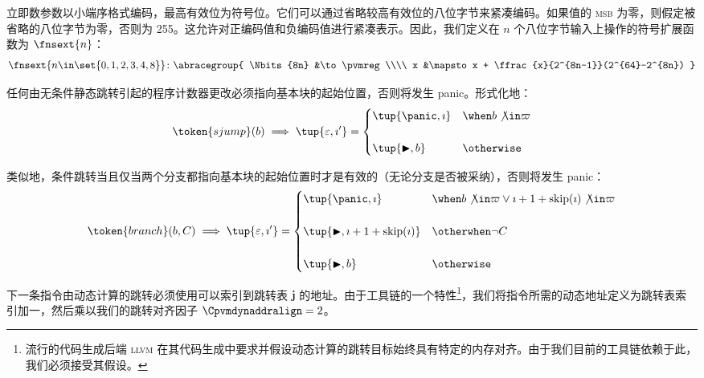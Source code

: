 立即数参数以小端序格式编码，最高有效位为符号位。它们可以通过省略较高有效位的八位字节来紧凑编码。如果值的 \textsc{msb} 为零，则假定被省略的八位字节为零，否则为 255。这允许对正编码值和负编码值进行紧凑表示。因此，我们定义在 $n$ 个八位字节输入上操作的符号扩展函数为 $\fnsext{n}$：
\begin{align}\label{eq:signedextension}
  \fnsext{n \in \set{0, 1, 2, 3, 4, 8}}\colon\abracegroup{
    \Nbits{8n} &\to \pvmreg\\\\
    x &\mapsto x + \ffrac{x}{2^{8n-1}}(2^{64}-2^{8n})
  }
\end{align}

任何由无条件静态跳转引起的程序计数器更改必须指向基本块的起始位置，否则将发生 panic。形式化地：
\begin{equation}
  \token{sjump}(b) \implies \tup{\varepsilon, \imath'} = \begin{cases}
    \tup{\panic, \imath} &\when b \not\in \basicblocks \\\\
    \tup{\continue, b} &\otherwise
  \end{cases}
\end{equation}

类似地，条件跳转当且仅当两个分支都指向基本块的起始位置时才是有效的（无论分支是否被采纳），否则将发生 panic：
\begin{equation}
  \token{branch}(b, C) \implies \tup{\varepsilon, \imath'} = \begin{cases}
    \tup{\panic, \imath} &\when b \not\in \basicblocks \lor \imath + 1 + \text{skip}(\imath) \not\in \basicblocks \\\\
    \tup{\continue, \imath + 1 + \Fskip(\imath)} &\otherwhen \lnot C \\\\
    \tup{\continue, b} &\otherwise
  \end{cases}
\end{equation}

下一条指令由动态计算的跳转必须使用可以索引到跳转表 $\mathbf{j}$ 的地址。由于工具链的一个特性\footnote{流行的代码生成后端 \textsc{llvm} 在其代码生成中要求并假设动态计算的跳转目标始终具有特定的内存对齐。由于我们目前的工具链依赖于此，我们必须接受其假设。}，我们将指令所需的动态地址定义为跳转表索引加一，然后乘以我们的跳转对齐因子 $\Cpvmdynaddralign = 2$。

